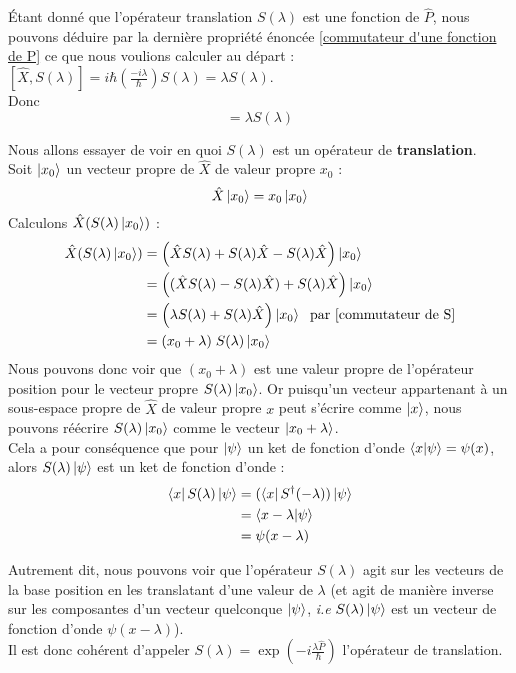 \documentclass{article}
\begin{document}
\'Etant donné que l'opérateur translation $S(\lambda)$ est une fonction de $\hat{P}$, nous pouvons déduire par la dernière propriété énoncée \eqref{commutateur d'une fonction de P} ce que nous voulions calculer au départ : 
$[\hat{X}, S(\lambda)] = i\hbar \left( \frac{-i \lambda}{\hbar} \right) S(\lambda) = \lambda S(\lambda)$. \\
Donc \begin{equation}
    [\hat{X}, S(\lambda)] =\lambda S(\lambda)
    \label{commutateur de S}
\end{equation}

Nous allons essayer de voir en quoi $S(\lambda)$ est un opérateur de \textbf{translation}. \\
Soit $\ket{x_0}$ un vecteur propre de $\hat{X}$ de valeur propre $x_0$ : $$ \hat{X} \ket{x_0} = x_0 \ket{x_0} $$
Calculons $\hat{X} (S(\lambda) \ket{x_0})$ : 
\begin{align}
    \hat{X} (S(\lambda) \ket{x_0}) &= \left( \hat{X}S(\lambda) + S(\lambda) \hat{X} - S(\lambda)\hat{X} \right) \ket{x_0} \notag \\
    &= \left( (\hat{X}S(\lambda) - S(\lambda)\hat{X}) + S(\lambda)\hat{X} \right) \ket{x_0} \notag \\
    &= \left( \lambda S(\lambda) + S(\lambda) \hat{X} \right) \ket{x_0} \; \mbox{ par \eqref{commutateur de S}} \notag \\
    &= (x_0 + \lambda) \; S(\lambda) \ket{x_0}
\end{align}
Nous pouvons donc voir que $(x_0 + \lambda)$ est une valeur propre de l'opérateur position pour le vecteur propre $S(\lambda) \ket{x_0}$. Or puisqu'un vecteur appartenant à un sous-espace propre de $\hat{X}$ de valeur propre $x$ peut s'écrire comme $\ket{x}$, nous pouvons réécrire $S(\lambda) \ket{x_0}$ comme le vecteur $\ket{x_0 + \lambda}$. \\

Cela a pour conséquence que pour $\ket{\psi}$ un ket de fonction d'onde $\braket{x|\psi} = \psi(x)$, alors $S(\lambda) \ket{\psi}$ est un ket de fonction d'onde : 
\begin{align}
    \bra{x}S(\lambda) \ket{\psi} &= (\bra{x}S^\dagger (-\lambda)) \ket{\psi} \notag \\
    &= \braket{x-\lambda | \psi} \notag \\
    &= \psi(x-\lambda) 
\end{align}

Autrement dit, nous pouvons voir que l'opérateur $S(\lambda)$ agit sur les vecteurs de la base position en les translatant d'une valeur de $\lambda$ (et agit de manière inverse sur les composantes d'un vecteur quelconque $\ket{\psi}$, \textit{i.e} $S(\lambda)\ket{\psi}$ est un vecteur de fonction d'onde $\psi(x-\lambda)$). \\
Il est donc cohérent d'appeler $S(\lambda) = \exp \left( -i \frac{\lambda \hat{P}}{\hbar} \right)$ l'opérateur de translation. 
\end{document}
